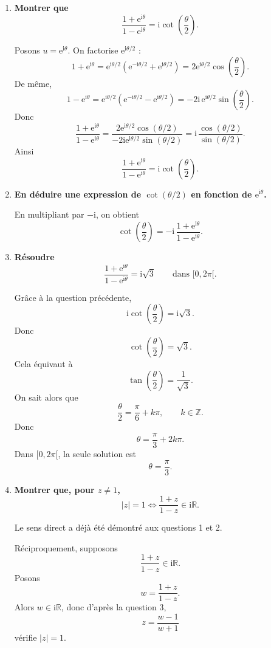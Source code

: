 \documentclass[11pt,a4paper]{article}
\newcommand{\R}{\mathbb{R}}
\newcommand{\ii}{\mathrm{i}}
\newcommand{\e}{\mathrm{e}}
\begin{document}
\begin{enumerate}[label=\textbf{\arabic*.}]
    \item \textbf{Montrer que
    \[
    \frac{1+\e^{\ii\theta}}{1-\e^{\ii\theta}}
    =\ii \cot\left(\frac{\theta}{2}\right).
    \]}

    Posons \(u=\e^{\ii\theta}\). On factorise \(\e^{\ii\theta/2}\) :
    \[
    1+\e^{\ii\theta}
    =\e^{\ii\theta/2}\left(\e^{-\ii\theta/2}+\e^{\ii\theta/2}\right)
    =2\e^{\ii\theta/2}\cos\left(\frac{\theta}{2}\right).
    \]
    De même,
    \[
    1-\e^{\ii\theta}
    =\e^{\ii\theta/2}\left(\e^{-\ii\theta/2}-\e^{\ii\theta/2}\right)
    =-2\ii\,\e^{\ii\theta/2}\sin\left(\frac{\theta}{2}\right).
    \]
    Donc
    \[
    \frac{1+\e^{\ii\theta}}{1-\e^{\ii\theta}}
    =\frac{2\e^{\ii\theta/2}\cos(\theta/2)}{-2\ii\e^{\ii\theta/2}\sin(\theta/2)}
    =\ii\,\frac{\cos(\theta/2)}{\sin(\theta/2)}.
    \]
    Ainsi
    \[
    \boxed{
    \frac{1+\e^{\ii\theta}}{1-\e^{\ii\theta}}
    =\ii \cot\left(\frac{\theta}{2}\right).}
    \]

    \item \textbf{En déduire une expression de \(\cot(\theta/2)\) en fonction de \(\e^{\ii\theta}\).}

    En multipliant par \(-\ii\), on obtient
    \[
    \boxed{
    \cot\left(\frac{\theta}{2}\right)
    =-\ii\,\frac{1+\e^{\ii\theta}}{1-\e^{\ii\theta}}.}
    \]

    \item \textbf{Résoudre
    \[
    \frac{1+\e^{\ii\theta}}{1-\e^{\ii\theta}}=\ii\sqrt3
    \qquad\text{dans } [0,2\pi[.
    \]}

    Grâce à la question précédente,
    \[
    \ii\cot\left(\frac{\theta}{2}\right)=\ii\sqrt3.
    \]
    Donc
    \[
    \cot\left(\frac{\theta}{2}\right)=\sqrt3.
    \]
    Cela équivaut à
    \[
    \tan\left(\frac{\theta}{2}\right)=\frac1{\sqrt3}.
    \]
    On sait alors que
    \[
    \frac{\theta}{2}=\frac{\pi}{6}+k\pi,\qquad k\in\mathbb{Z}.
    \]
    Donc
    \[
    \theta=\frac{\pi}{3}+2k\pi.
    \]
    Dans \([0,2\pi[\), la seule solution est
    \[
    \boxed{\theta=\frac{\pi}{3}.}
    \]

    \item \textbf{Montrer que, pour \(z\neq 1\),
    \[
    |z|=1
    \Longleftrightarrow
    \frac{1+z}{1-z}\in\ii\R.
    \]}

    Le sens direct a déjà été démontré aux questions 1 et 2.

    Réciproquement, supposons
    \[
    \frac{1+z}{1-z}\in\ii\R.
    \]
    Posons
    \[
    w=\frac{1+z}{1-z}.
    \]
    Alors \(w\in\ii\R\), donc d’après la question 3,
    \[
    z=\frac{w-1}{w+1}
    \]
    vérifie \(|z|=1\).


\end{enumerate}
\end{document}
